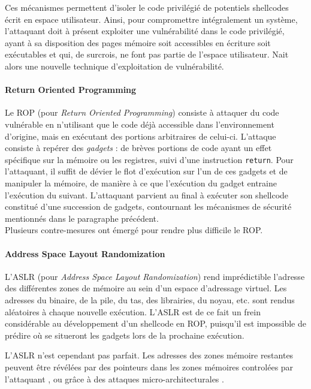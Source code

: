 Ces mécanismes permettent d'isoler le code privilégié de potentiels shellcodes écrit en espace utilisateur. Ainsi, pour compromettre intégralement un système, l'attaquant doit à présent exploiter une vulnérabilité dans le code privilégié, ayant à sa disposition des pages mémoire soit accessibles en écriture soit exécutables et qui, de surcrois, ne font pas partie de l'espace utilisateur.
Nait alors une nouvelle technique d'exploitation de vulnérabilité. 

\paragraph{Return Oriented Programming}
\label{ROP}
Le ROP (pour \emph{Return Oriented Programming}) consiste à attaquer du code vulnérable en n'utilisant que le code déjà accessible dans l'environnement d'origine, mais en exécutant des portions arbitraires de celui-ci. L'attaque consiste à repérer des \emph{gadgets} : de brèves portions de code ayant un effet spécifique sur la mémoire ou les registres, suivi d'une instruction \texttt{return}. Pour l'attaquant, il suffit de dévier le flot d'exécution sur l'un de ces gadgets et de manipuler la mémoire, de manière à ce que l'exécution du gadget entraine l'exécution du suivant. L'attaquant parvient au final à exécuter son shellcode constitué d'une succession de gadgets, contournant les mécanismes de sécurité mentionnés dans le paragraphe précédent.\\

Plusieurs contre-mesures ont émergé pour rendre plus difficile le ROP.

\paragraph{Address Space Layout Randomization}
\label{aslr}
L'ASLR (pour \emph{Address Space Layout Randomization}) rend imprédictible l'adresse des différentes zones de mémoire au sein d'un espace d'adressage virtuel. Les adresses du binaire, de la pile, du tas, des librairies, du noyau, etc. sont rendus aléatoires à chaque nouvelle exécution. L'ASLR est de ce fait un frein considérable au développement d'un shellcode en ROP, puisqu'il est impossible de prédire où se situeront les gadgets lors de la prochaine exécution.

L'ASLR n'est cependant pas parfait. Les adresses des zones mémoire restantes peuvent être révélées par des pointeurs dans les zones mémoires controlées par l'attaquant \cite{bypasskaslr}, ou grâce à des attaques micro-architecturales \cite{microarchitecturalbypass}.

